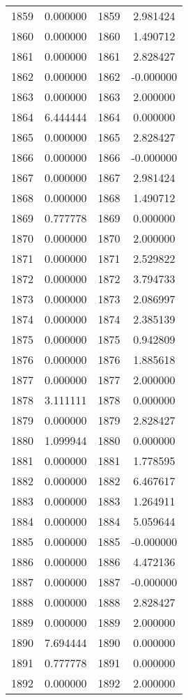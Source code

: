 \documentclass[12pt]{article}
\begin{document}
\begin{longtable}{@{}cccc@{}}
1859 & 0.000000 & 1859 & 2.981424 \\
1860 & 0.000000 & 1860 & 1.490712 \\
1861 & 0.000000 & 1861 & 2.828427 \\
1862 & 0.000000 & 1862 & -0.000000 \\
1863 & 0.000000 & 1863 & 2.000000 \\
1864 & 6.444444 & 1864 & 0.000000 \\
1865 & 0.000000 & 1865 & 2.828427 \\
1866 & 0.000000 & 1866 & -0.000000 \\
1867 & 0.000000 & 1867 & 2.981424 \\
1868 & 0.000000 & 1868 & 1.490712 \\
1869 & 0.777778 & 1869 & 0.000000 \\
1870 & 0.000000 & 1870 & 2.000000 \\
1871 & 0.000000 & 1871 & 2.529822 \\
1872 & 0.000000 & 1872 & 3.794733 \\
1873 & 0.000000 & 1873 & 2.086997 \\
1874 & 0.000000 & 1874 & 2.385139 \\
1875 & 0.000000 & 1875 & 0.942809 \\
1876 & 0.000000 & 1876 & 1.885618 \\
1877 & 0.000000 & 1877 & 2.000000 \\
1878 & 3.111111 & 1878 & 0.000000 \\
1879 & 0.000000 & 1879 & 2.828427 \\
1880 & 1.099944 & 1880 & 0.000000 \\
1881 & 0.000000 & 1881 & 1.778595 \\
1882 & 0.000000 & 1882 & 6.467617 \\
1883 & 0.000000 & 1883 & 1.264911 \\
1884 & 0.000000 & 1884 & 5.059644 \\
1885 & 0.000000 & 1885 & -0.000000 \\
1886 & 0.000000 & 1886 & 4.472136 \\
1887 & 0.000000 & 1887 & -0.000000 \\
1888 & 0.000000 & 1888 & 2.828427 \\
1889 & 0.000000 & 1889 & 2.000000 \\
1890 & 7.694444 & 1890 & 0.000000 \\
1891 & 0.777778 & 1891 & 0.000000 \\
1892 & 0.000000 & 1892 & 2.000000 \\

\end{longtable}
\end{document}
